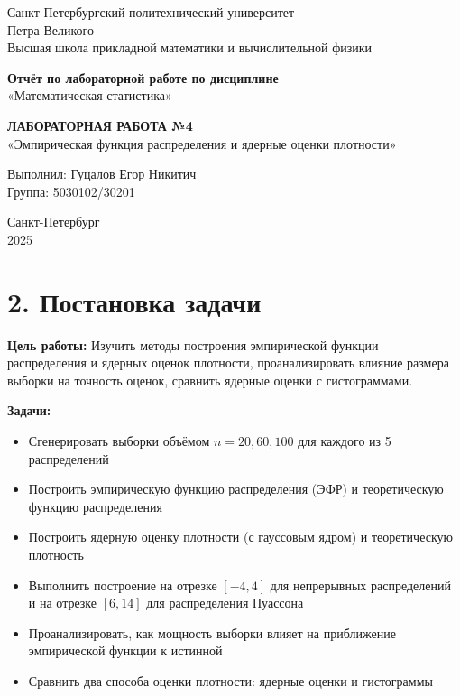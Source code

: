 \documentclass[a4paper,14pt]{extarticle}
\begin{document}
\begin{titlepage}
\begin{center}
\large
Санкт-Петербургский политехнический университет \\
Петра Великого \\
Высшая школа прикладной математики и вычислительной физики \\
\vspace{3cm}

\textbf{Отчёт по лабораторной работе по дисциплине} \\
«Математическая статистика» \\
\vspace{0.5cm}

\textbf{ЛАБОРАТОРНАЯ РАБОТА №4} \\
«Эмпирическая функция распределения и ядерные оценки плотности» \\
\vspace{2cm}

Выполнил: Гуцалов Егор Никитич \\
Группа: 5030102/30201 \\
\vfill

Санкт-Петербург \\
2025
\end{center}
\end{titlepage}

\section*{2. Постановка задачи}

\textbf{Цель работы:} Изучить методы построения эмпирической функции распределения и ядерных оценок плотности, проанализировать влияние размера выборки на точность оценок, сравнить ядерные оценки с гистограммами.

\textbf{Задачи:}
\begin{itemize}
    \item Сгенерировать выборки объёмом $n = 20, 60, 100$ для каждого из 5 распределений
    \item Построить эмпирическую функцию распределения (ЭФР) и теоретическую функцию распределения
    \item Построить ядерную оценку плотности (с гауссовым ядром) и теоретическую плотность
    \item Выполнить построение на отрезке $[-4, 4]$ для непрерывных распределений и на отрезке $[6, 14]$ для распределения Пуассона
    \item Проанализировать, как мощность выборки влияет на приближение эмпирической функции к истинной
    \item Сравнить два способа оценки плотности: ядерные оценки и гистограммы
\end{itemize}
\end{document}
